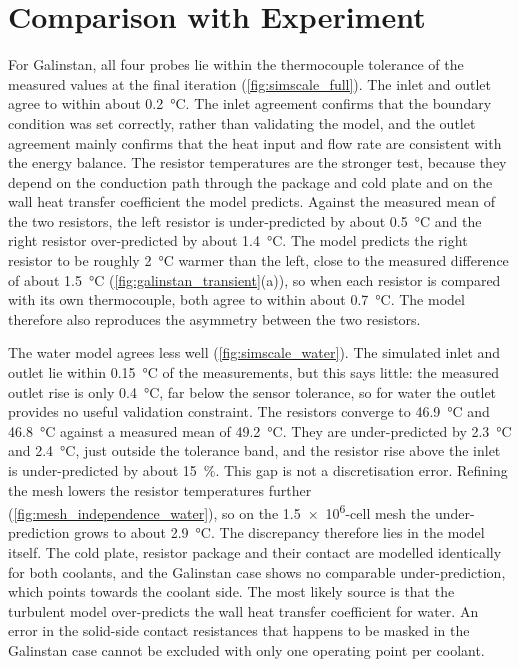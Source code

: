 \section{Comparison with Experiment}

For Galinstan, all four probes lie within the thermocouple tolerance of the
measured values at the final iteration (\cref{fig:simscale_full}). The inlet and outlet
agree to within about \SI{0.2}{\celsius}. The inlet agreement confirms that
the boundary condition was set correctly, rather than validating the model, and
the outlet agreement mainly confirms that the heat input and flow rate are
consistent with the energy balance. The resistor temperatures are the stronger
test, because they depend on the conduction path through the package and cold
plate and on the wall heat transfer coefficient the model predicts. Against the
measured mean of the two resistors, the left resistor is under-predicted by about
\SI{0.5}{\celsius} and the right resistor over-predicted by about
\SI{1.4}{\celsius}. The model predicts the right resistor to be roughly
\SI{2}{\celsius} warmer than the left, close to the measured difference of about
\SI{1.5}{\celsius} (\cref{fig:galinstan_transient}(a)), so when each resistor is
compared with its own thermocouple, both agree to within about
\SI{0.7}{\celsius}. The model therefore also reproduces the asymmetry between the
two resistors.

The water model agrees less well (\cref{fig:simscale_water}). The
simulated inlet and outlet lie within \SI{0.15}{\celsius} of the measurements,
but this says little: the measured outlet rise is only \SI{0.4}{\celsius},
far below the sensor tolerance, so for water the outlet provides no useful
validation constraint. The resistors converge to \SI{46.9}{\celsius} and
\SI{46.8}{\celsius} against a measured mean of \SI{49.2}{\celsius}. They are
under-predicted by \SI{2.3}{\celsius} and \SI{2.4}{\celsius}, just outside the
tolerance band, and the resistor rise above the inlet is under-predicted by
about \SI{15}{\percent}. This gap is not a discretisation error. Refining the
mesh lowers the resistor temperatures further
(\cref{fig:mesh_independence_water}), so on the \num{1.5e6}-cell mesh the
under-prediction grows to about \SI{2.9}{\celsius}. The discrepancy therefore
lies in the model itself. The cold plate, resistor package and their contact
are modelled identically for both coolants, and the Galinstan case shows no
comparable under-prediction, which points towards the coolant side. The most
likely source is that the turbulent model over-predicts the wall heat transfer
coefficient for water. An error in the solid-side contact resistances that
happens to be masked in the Galinstan case cannot be excluded with only one
operating point per coolant.

